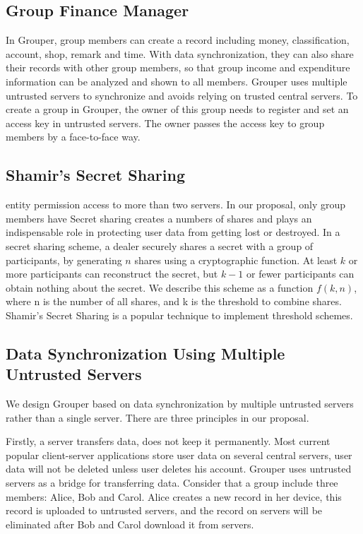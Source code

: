 \documentclass[twocolumn,10pt]{article}
\begin{document}
\subsection{Group Finance Manager}
 In Grouper, group members can create a record including money, classification, account, shop, remark and time. With data synchronization, they can also share their records with other group members, so that group income and expenditure information can be analyzed and shown to all members. Grouper uses multiple untrusted servers to synchronize and avoids relying on trusted central servers. To create a group in Grouper, the owner of this group needs to register and set an access key in untrusted servers. The owner  passes the access key to group members by a face-to-face way.

\subsection{Shamir's Secret Sharing} entity permission access to more than two servers. In our proposal, only group members have
Secret sharing creates a numbers of shares and plays an indispensable role in protecting user data from getting lost or destroyed. In a secret sharing scheme, a dealer securely shares a secret with a group of participants, by generating $n$ shares using a cryptographic function\cite{smith2013layered}. At least $k$ or more participants can reconstruct the secret, but $k-1$ or fewer participants can obtain nothing about the secret\cite{pang2005new}. We describe this scheme as a function $f(k, n)$, where n is the number of all shares, and k is the threshold to combine shares.  Shamir's Secret Sharing is a popular technique to implement threshold schemes.

\subsection{Data Synchronization Using Multiple Untrusted Servers}

We design Grouper based on data synchronization by multiple untrusted servers rather than a single server. There are three principles in our proposal. 

Firstly, a server transfers data, does not keep it permanently. Most current popular client-server applications store user data on several central servers, user data will not be deleted unless user deletes his account. Grouper uses untrusted servers as a bridge for transferring data. Consider that a group include three members: Alice, Bob and Carol. Alice creates a new record in her device, this record is uploaded to untrusted servers, and the record on servers will be eliminated after Bob and Carol download it from servers.
\end{document}
